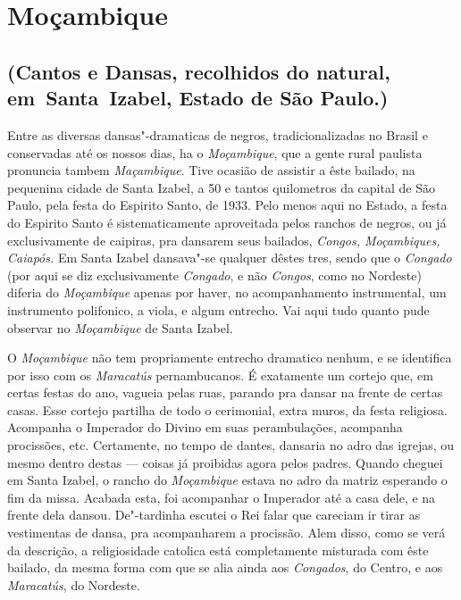 \chapter*{Moçambique}


\section{(Cantos e Dansas, recolhidos do natural, em~Santa~Izabel, Estado
de São Paulo.)}

Entre as diversas dansas"-dramaticas de negros, tradicionalizadas no
Brasil e conservadas até os nossos dias, ha o \emph{Moçambique}, que a
gente rural paulista pronuncia tambem \emph{Maçambique}. Tive ocasião de
assistir a êste bailado, na pequenina cidade de Santa Izabel, a 50 e
tantos quilometros da capital de São Paulo, pela festa do Espirito
Santo, de 1933. Pelo menos aqui no Estado, a festa do Espirito Santo é
sistematicamente aproveitada pelos ranchos de negros, ou já
exclusivamente de caipiras, pra dansarem seus bailados, \emph{Congos,
Moçambiques, Caiapós.} Em Santa Izabel dansava"-se qualquer dêstes tres,
sendo que o \emph{Congado} (por aqui se diz exclusivamente
\emph{Congado}, e não \emph{Congos}, como no Nordeste) diferia do
\emph{Moçambique} apenas por haver, no acompanhamento instrumental, um
instrumento polifonico, a viola, e algum entrecho. Vai aqui tudo quanto
pude observar no \emph{Moçambique} de Santa Izabel.

O \emph{Moçambique} não tem propriamente entrecho dramatico nenhum, e se
identifica por isso com os \emph{Maracatús} pernambucanos. É exatamente
um cortejo que, em certas festas do ano, vagueia pelas ruas, parando pra
dansar na frente de certas casas. Esse cortejo partilha de todo o
cerimonial, extra muros, da festa religiosa. Acompanha o Imperador do
Divino em suas perambulações, acompanha procissões, etc. Certamente, no
tempo de dantes, dansaria no adro das igrejas, ou mesmo dentro destas ---
coisas já proibidas agora pelos padres. Quando cheguei em Santa Izabel,
o rancho do \emph{Moçambique} estava no adro da matriz esperando o fim
da missa. Acabada esta, foi acompanhar o Imperador até a casa dele, e na
frente dela dansou. De"-tardinha escutei o Rei falar que careciam ir
tirar as vestimentas de dansa, pra acompanharem a procissão. Alem disso,
como se verá da descrição, a religiosidade catolica está completamente
misturada com êste bailado, da mesma forma com que se alia ainda aos
\emph{Congados}, do Centro, e aos \emph{Maracatús}, do Nordeste.

